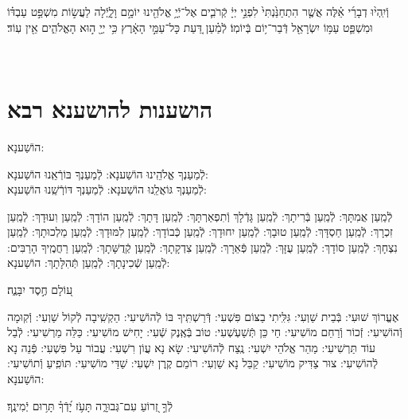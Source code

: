 \documentclass[twoside, openany, parskip=half, 11pt]{book}
\begin{document}
וְֿיִֽהְי֨וּ דְבָרַ֜י אֵ֗לֶּה אֲשֶׁ֤ר הִתְחַנַּ֙נְתִּי֙ לִפְנֵ֣י יְיָ֔ קְֿרֹבִ֛ים אֶל־יְֿיָ֥ אֱלֹהֵ֖ינוּ יוֹמָ֣ם וָלָ֑יְֿלָה לַעֲשׂ֣וֹת מִשְׁפַּ֣ט עַבְדּ֗וֹ וּמִשְׁפַּ֛ט עַמּ֥וֹ יִשְׂרָאֵ֖ל דְּֿבַר־י֥וֹם בְּֿיוֹמֽוֹ׃ לְֿמַ֗עַן דַּ֚עַת כָּל־עַמֵּ֣י הָאָ֔רֶץ כִּ֥י יְיָ֖ ה֣וּא הָאֱלֹהִ֑ים אֵ֖ין עֽוֹד׃

\vfill
{}\\

\clearpage

\vspace{-1\baselineskip}
\section[הושענות להושענא רבא]{ הושענות להושענא רבא }

\begin{Large}
הוֹשַׁענָא:
\end{Large}


לְֿמַעַנְךָ אֱלֹהֵֽינוּ הוֹשַׁענָא: לְֿמַעַנְךָ בּוֹרְֿאֵֽנוּ הוֹשַׁענָא:\\
לְֿמַעַנְךָ גּוֹאֲלֵֽנוּ הוֹשַׁענָא: לְֿמַעַנְךָ דּוֹרְֿשֵֽׁנוּ הוֹשַׁענָא:

לְֿמַֽעַן אֲמִתָּךְ: לְֿמַֽעַן בְּֿרִיתָךְ: לְֿמַֽעַן גָּדְֿלָךְ וְֿתִפְאַרְתָּךְ: לְֿמַֽעַן דָּתָךְ: לְֿמַֽעַן הוֹדָךְ: לְֿמַֽעַן וִעוּדָךְ: לְֿמַֽעַן זִכְרָךְ: לְֿמַֽעַן חַסְדָּךְ: לְֿמַֽעַן טוּבָךְ: לְֿמַֽעַן יִחוּדָךְ: לְֿמַֽעַן כְּֿבוֹדָךְ: לְֿמַֽעַן לִמּוּדָךְ: לְֿמַֽעַן מַלְכוּתָךְ: לְֿמַֽעַן נִצְחָךְ: לְֿמַֽעַן סוֹדָךְ: לְֿמַֽעַן עֻזָּךְ: לְֿמַֽעַן פְּֿאֵרָךְ: לְֿמַֽעַן צִדְקָתָךְ: לְֿמַֽעַן קְֿדֻשָּׁתָךְ: לְֿמַֽעַן רַחֲמֶֽיךָ הָרַבִּים:
לְֿמַֽעַן שְֿׁכִינָתָךְ:
לְֿמַֽעַן תְּֿהִלָּתָךְ: הוֹשַׁענָא:

ע֭וֹלָם חֶ֣סֶד יִבָּנֶ֑ה׃

אֶעֱרוֹךְ שׁוּעִי: בְּֿבֵית שַׁוְעִי: גִּלִּֽיתִי בַצּוֹם פִּשְׁעִי: דְּֿרַשְׁתִּֽיךָ בּוֹ לְֿהוֹשִׁיעִי: הַקְשִֽׁיבָה לְֿקוֹל שַׁוְעִי: וְֿקֽוּמָה וְֿהוֹשִׁיעִי: זְֿכוֹר וְֿרַחֵם מוֹשִׁיעִי: חַי כֵּן תְּֿשַׁעְשְׁעִי: טוֹב בְּֿאֶֽנֶק שְֿׁעִי: יָחִישׁ מוֹשִׁיעִי: כַּלֵּה מַרְשִׁיעִי: לְֿבַל עוֹד תַּרְשִׁיעִי: מַהֵר אֱלֹהֵי יִשְׁעִי: נֶֽצַח לְֿהוֹשִׁיעִי: שָׂא נָא עֲוֹן רִשְׁעִי: עֲבוֹר עַל פִּשְׁעִי: פְּֿנֵה נָא לְֿהוֹשִׁיעִי: צוּר צַדִּיק מוֹשִׁיעִי: קַבֵּל נָא שַׁוְעִי: רוֹמֵם קֶֽרֶן יִשְׁעִי:
שַׁדַּי מוֹשִׁיעִי:
תּוֹפִֽיעַ וְֿתוֹשִׁיעִי: הוֹשַׁענָא:

לְֿךָ֣ זְ֭רוֹעַ עִם־גְּבוּרָ֑ה תָּעֹ֥ז יָ֝דְֿךָ֗ תָּר֥וּם יְֿמִינֶֽךָ׃
\end{document}
